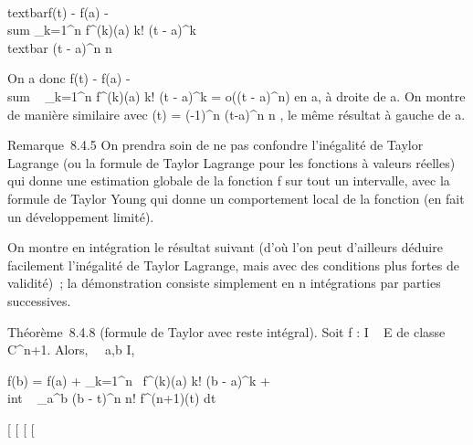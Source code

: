 \documentclass[]{article}
\begin{document}
\\textbar{}f(t) - f(a) -\\sum
\_k=1^n f^(k)(a) \over k!
(t - a)^k\\textbar{} \leq \epsilon(t - a)^n
\over n

On a donc f(t) - f(a)
-\\sum ~
\_k=1^n f^(k)(a) \over k!
(t - a)^k = o((t - a)^n) en a, à droite de a. On
montre de manière similaire avec \psi(t) = (-1)^n
\epsilon(t-a)^n \over n , le même résultat à gauche
de a.

Remarque~8.4.5 On prendra soin de ne pas confondre l'inégalité de Taylor
Lagrange (ou la formule de Taylor Lagrange pour les fonctions à valeurs
réelles) qui donne une estimation globale de la fonction f sur tout un
intervalle, avec la formule de Taylor Young qui donne un comportement
local de la fonction (en fait un développement limité).

On montre en intégration le résultat suivant (d'où l'on peut d'ailleurs
déduire facilement l'inégalité de Taylor Lagrange, mais avec des
conditions plus fortes de validité)~; la démonstration consiste
simplement en n intégrations par parties successives.

Théorème~8.4.8 (formule de Taylor avec reste intégral). Soit f : I \rightarrow~ E
de classe C^n+1. Alors, \forall~~a,b \in I,

f(b) = f(a) + \sum \_k=1^n~
f^(k)(a) \over k! (b - a)^k +
\\int  ~
\_a^b (b - t)^n \over n!
f^(n+1)(t) dt

{[}
{[}
{[}
{[}
\end{document}
